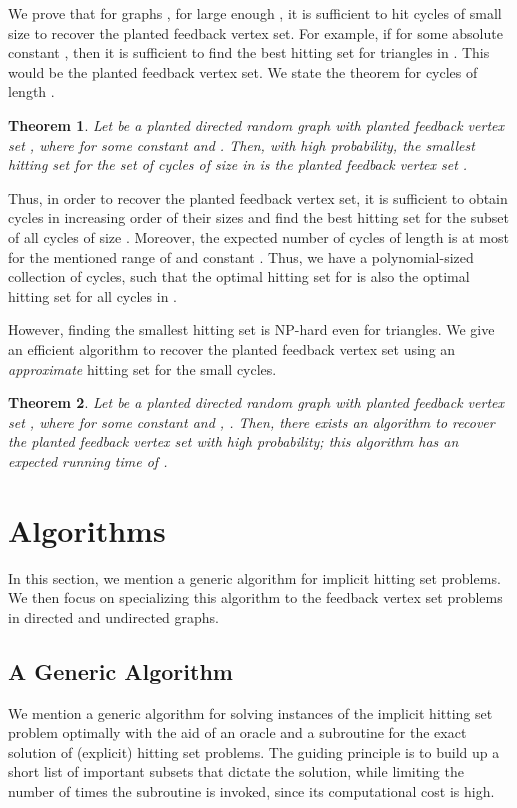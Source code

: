 \documentclass[11pt]{article}
\newtheorem{theorem}{Theorem}
\begin{document}
We prove that for graphs , for large enough , it is sufficient to hit cycles of small size to recover the planted feedback vertex set. For example, if  for some absolute constant , then it is sufficient to find the best hitting set for triangles in . This would be the planted feedback vertex set. We state the theorem for cycles of length .
\begin{theorem}\label{theorem:planted-directedFVS}
Let  be a planted directed random graph  with planted feedback vertex set , where  for some constant  and . Then, with high probability, the smallest hitting set for the set of cycles of size  in  is the planted feedback vertex set .
\end{theorem}
Thus, in order to recover the planted feedback vertex set, it is sufficient to obtain cycles in increasing order of their sizes and find the best hitting set for the subset of all cycles of size . Moreover, the expected number of cycles of length  is at most  for the mentioned range of  and constant . Thus, we have a polynomial-sized collection  of cycles, such that the optimal hitting set for  is also the optimal hitting set for all cycles in .

However, finding the smallest hitting set is NP-hard even for triangles. We give an efficient algorithm to recover the planted feedback vertex set using an \emph{approximate} hitting set for the small cycles.
\begin{theorem}\label{theorem:algorithm-planted-directedFVS}
Let  be a planted directed random graph  with planted feedback vertex set , where  for some constant  and , . Then, there exists an algorithm to recover the planted feedback vertex set  with high probability; this algorithm has an expected running time of .
\end{theorem}

\section{Algorithms}
In this section, we mention a generic algorithm for implicit hitting set problems. We then focus on specializing this algorithm to the feedback vertex set problems in directed and undirected graphs.

\subsection{A Generic Algorithm}
We mention a generic algorithm for solving instances of the implicit hitting
set problem optimally with the aid of an oracle and a subroutine for the exact solution of (explicit) hitting set problems. The guiding principle is to build up a short list of important subsets that dictate the solution, while limiting the number of times the subroutine is invoked, since its computational cost is
high.
\end{document}
